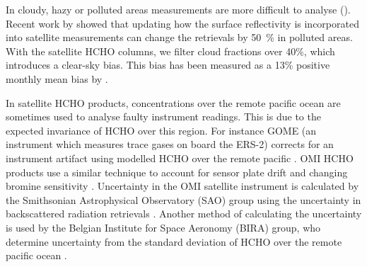       
      
      In cloudy, hazy or polluted areas measurements are more difficult to analyse (\cite[e.g.][]{Palmer2003,Marais2014}).
      Recent work by \textcite{Vasilkov2017} showed that updating how the surface reflectivity is incorporated into satellite measurements can change the retrievals by 50~\% in polluted areas.
      With the satellite HCHO columns, we filter cloud fractions over 40\%, which introduces a clear-sky bias.
      This bias has been measured as a 13\% positive monthly mean bias by \textcite{Palmer2001, Surl2018}.
      
      In satellite HCHO products, concentrations over the remote pacific ocean are sometimes used to analyse faulty instrument readings.
      This is due to the expected invariance of HCHO over this region.
      For instance GOME (an instrument which measures trace gases on board the ERS-2) corrects for an instrument artifact using modelled HCHO over the remote pacific \parencite{Shim2005}.
      OMI HCHO products use a similar technique to account for sensor plate drift and changing bromine sensitivity \parencite{Abad2015}.
      Uncertainty in the OMI satellite instrument is calculated by the Smithsonian Astrophysical Observatory (SAO) group using the uncertainty in backscattered radiation retrievals \parencite{Abad2015, Abad2016}.
      Another method of calculating the uncertainty is used by the Belgian Institute for Space Aeronomy (BIRA) group, who determine uncertainty from the standard deviation of HCHO over the remote pacific ocean \parencite{DeSmedt2012, DeSmedt2015}.
      

